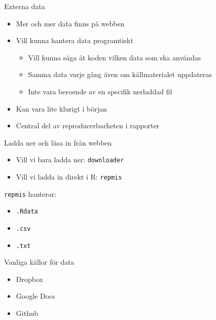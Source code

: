 \documentclass[
  11pt,
  ignorenonframetext,
  handout]{beamer}
\providecommand{\tightlist}{%
  \setlength{\itemsep}{0pt}\setlength{\parskip}{0pt}}
\begin{document}
\begin{frame}{Externa data}
\label{externa-data}
\begin{itemize}
\tightlist
\item
  Mer och mer data finns på webben
\item
  Vill kunna hantera data programtiskt

  \begin{itemize}
  \tightlist
  \item
    Vill kunna säga åt koden vilken data som ska användas
  \item
    Samma data varje gång även om källmaterialet uppdateras
  \item
    Inte vara beroende av en specifik nerladdad fil
  \end{itemize}
\item
  Kan vara lite klurigt i början
\item
  Central del av reproducerbarheten i rapporter
\end{itemize}
\end{frame}

\begin{frame}{Ladda ner och läsa in från webben}
\label{ladda-ner-och-luxe4sa-in-fruxe5n-webben}
\begin{itemize}
\tightlist
\item
  Vill vi bara ladda ner: \texttt{downloader}
\item
  Vill vi ladda in direkt i R: \texttt{repmis}
\end{itemize}

\texttt{repmis} hanterar:

\begin{itemize}
\tightlist
\item
  \texttt{.Rdata}
\item
  \texttt{.csv}
\item
  \texttt{.txt}
\end{itemize}
\end{frame}

\begin{frame}{Vanliga källor för data}
\label{vanliga-kuxe4llor-fuxf6r-data}
\begin{itemize}
\tightlist
\item
  Dropbox
\item
  Google Docs
\item
  Github
\end{itemize}
\end{frame}
\end{document}
